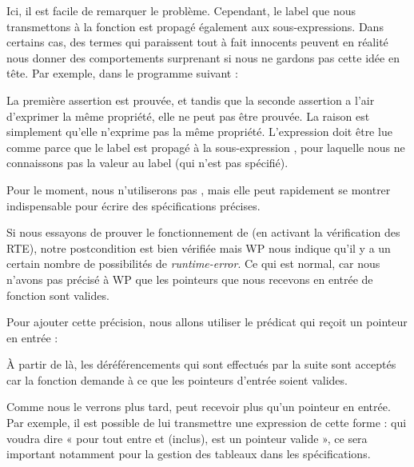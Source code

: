 

Ici, il est facile de remarquer le problème. Cependant, le label que nous
transmettons à la fonction  est propagé également
aux sous-expressions. Dans certains cas, des termes qui paraissent tout à fait
innocents peuvent en réalité nous donner des comportements surprenant si nous
ne gardons pas cette idée en tête. Par exemple, dans le programme suivant :




La première assertion est prouvée, et tandis que la seconde assertion a l'air
d'exprimer la même propriété, elle ne peut pas être prouvée. La raison est
simplement qu'elle n'exprime pas la même propriété. L'expression
 doit être lue comme
 parce que le
label est propagé à la sous-expression , pour laquelle nous ne
connaissons pas la valeur au label  (qui n'est pas spécifié).


Pour le moment, nous n'utiliserons pas , mais elle peut rapidement se
montrer indispensable pour écrire des spécifications précises.





Si nous essayons de prouver le fonctionnement de  (en activant
la vérification des RTE), notre postcondition est bien vérifiée mais WP nous
indique qu'il y a un certain nombre de possibilités de \textit{runtime-error}. Ce qui
est normal, car nous n'avons pas précisé à WP que les pointeurs que nous
recevons en entrée de fonction sont valides.



Pour ajouter cette précision, nous allons utiliser le prédicat  qui
reçoit un pointeur en entrée :






À partir de là, les déréférencements qui sont effectués par la suite sont
acceptés car la fonction demande à ce que les pointeurs d'entrée soient
valides.



Comme nous le verrons plus tard,  peut recevoir plus qu'un
pointeur en entrée. Par exemple, il est possible de lui transmettre une
expression de cette forme :  qui voudra dire « pour
tout  entre  et  (inclus),  est un pointeur valide », ce sera important
notamment pour la gestion des tableaux dans les spécifications.



